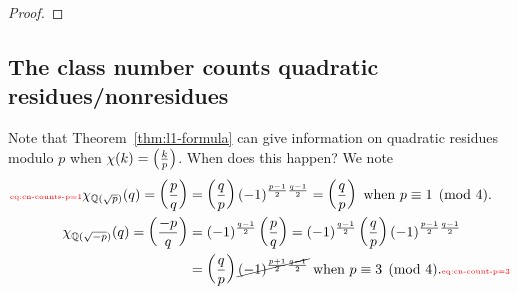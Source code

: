 \begin{proof}
\end{proof}


\subsection{The class number counts quadratic residues/nonresidues}

Note that Theorem~\ref{thm:l1-formula} can give information on quadratic residues modulo $p$ when $\chi(k)=\left( {\frac{k}{p}} \right)$. When does this happen? We note
\begin{align}
\llabel{eq:cn-counts-p=1}
\chi_{\Q(\sqrt{p})}(q)=\pf{p}{q}&=\pf{q}{p}(-1)^{\fc{p-1}{2}
\fc{q-1}{2}}=\pf{q}{p}\text{ when }p\equiv 1\pmod 4.\\
\chi_{\Q(\sqrt{-p})}(q)=\pf{-p}{q}&=(-1)^{\fc{q-1}{2}}\pf{p}{q}=(-1)^{\fc{q-1}{2}}\pf{q}{p}(-1)^{\fc{p-1}{2}
\fc{q-1}{2}}\\
&=\pf{q}{p}\cancel{(-1)^{\fc{p+1}{2}\fc{q-1}{2}}}\text{ when }p\equiv 3\pmod 4.
\llabel{eq:cn-count-p=3}
\end{align}

